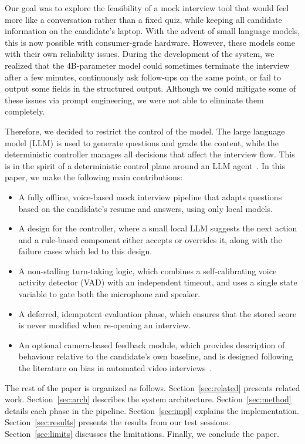 \documentclass[conference]{IEEEtran}
\begin{document}
Our goal was to explore the feasibility of a mock interview tool that would feel more like a conversation rather than a fixed quiz, while keeping all candidate information on the candidate's laptop. With the advent of small language models, this is now possible with consumer-grade hardware. However, these models come with their own reliability issues. During the development of the system, we realized that the 4B-parameter model could sometimes terminate the interview after a few minutes, continuously ask follow-ups on the same point, or fail to output some fields in the structured output. Although we could mitigate some of these issues via prompt engineering, we were not able to eliminate them completely.

Therefore, we decided to restrict the control of the model. The large language model (LLM) is used to generate questions and grade the content, while the deterministic controller manages all decisions that affect the interview flow. This is in the spirit of a deterministic control plane around an LLM agent~\cite{madatha2026}. In this paper, we make the following main contributions:
\begin{itemize}
\item A fully offline, voice-based mock interview pipeline that adapts questions based on the candidate's resume and answers, using only local models.
\item A design for the controller, where a small local LLM suggests the next action and a rule-based component either accepts or overrides it, along with the failure cases which led to this design.
\item A non-stalling turn-taking logic, which combines a self-calibrating voice activity detector (VAD) with an independent timeout, and uses a single state variable to gate both the microphone and speaker.
\item A deferred, idempotent evaluation phase, which ensures that the stored score is never modified when re-opening an interview.
\item An optional camera-based feedback module, which provides description of behaviour relative to the candidate's own baseline, and is designed following the literature on bias in automated video interviews~\cite{booth2023,fabris2023}.
\end{itemize}

The rest of the paper is organized as follows. Section~\ref{sec:related} presents related work. Section~\ref{sec:arch} describes the system architecture. Section~\ref{sec:method} details each phase in the pipeline. Section~\ref{sec:impl} explains the implementation. Section~\ref{sec:results} presents the results from our test sessions. Section~\ref{sec:limits} discusses the limitations. Finally, we conclude the paper.
\end{document}
